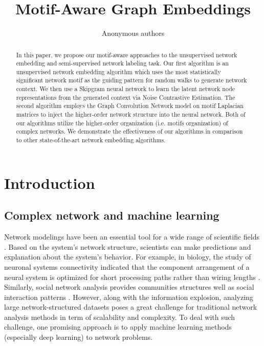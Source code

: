 \documentclass{article}
\title{Motif-Aware Graph Embeddings}
\author{Anonymous authors}
\theoremstyle{definition}
\begin{document}
\maketitle

\begin{abstract}

  In this paper, we propose our motif-aware approaches to the 
  unsupervised network embedding and semi-supervised network labeling 
  task. Our first algorithm is an unsupervised network embedding 
  algorithm which uses the most statistically significant network motif 
  as the guiding pattern for random walks to generate network context. We 
  then use a Skipgram neural network to learn the latent network node 
  representations from the generated context via Noise Contrastive 
  Estimation. The second algorithm employs the Graph Convolution Network 
  model on motif Laplacian matrices to inject the higher-order network 
  structure into the neural network. Both of our algorithms utilize the 
  higher-order organization (i.e. motifs organization) of complex 
  networks. We demonstrate the effectiveness of our algorithms in 
  comparison to other state-of-the-art network embedding algorithms.

\end{abstract}

\section{Introduction}

\subsection{Complex network and machine learning}

Network modelings have been an essential tool for a wide
range of scientific fields
\cite{physicnet,molecule,motifblockmilo,juremotif}. 
Based on the system's network structure, 
scientists can make predictions and explanation
about the system's behavior. For example, in biology, the
study of neuronal systems connectivity indicated
that the component arrangement of a neural system is optimized
for short processing paths rather than wiring lengths
\cite{kaiser2006nonoptimal}. Similarly, social network
analysis provides communities structures well as 
social interaction patterns 
\cite{west2014exploiting,barabasi2014network}. 
However, along with the information explosion, analyzing
large network-structured datasets poses a great challenge 
for traditional network analysis methods in term of 
scalability and complexity. To deal with such challenge,
one promising approach is to apply machine learning methods 
(especially deep learning) to network problems.
\end{document}
